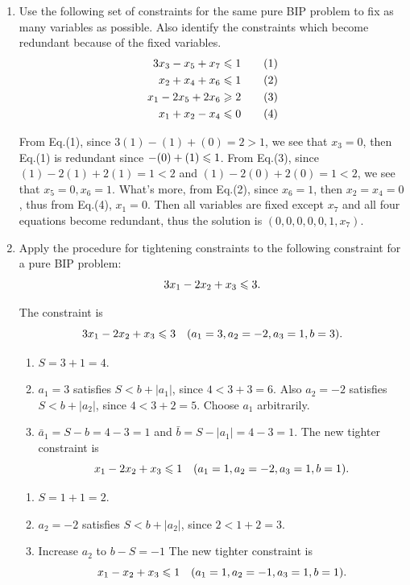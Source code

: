 \documentclass[a4paper]{article}
\begin{document}
\begin{enumerate}
\item Use the following set of constraints for the same pure BIP problem to fix as many variables as possible. Also identify the constraints which become redundant because of the fixed variables.
\begin{equation*}
\begin{aligned}
3x_3-x_5+x_7&\leqslant 1\qquad(1)\\
x_2+x_4+x_6&\leqslant 1\qquad(2)\\
x_1-2x_5+2x_6&\geqslant 2\qquad(3)\\
x_1+x_2-x_4&\leqslant 0\qquad(4)\\
\end{aligned}
\end{equation*}

\begin{solution}
	
	From Eq.(1), since $3(1)-(1)+(0)=2>1$, we see that $x_3=0$, then Eq.(1) is redundant since $-(0)+(1)\leqslant 1$. From Eq.(3), since $  (1)-2(1)+2(1)=1<2$ and $(1)-2(0)+2(0)=1<2$, we see that $x_5=0, x_6=1$. What's more, from Eq.(2), since $x_6=1$, then $x_2=x_4=0$, thus from Eq.(4), $x_1=0$. Then all variables are fixed except $x_7$ and all four equations become redundant, thus the solution is $(0,0,0,0,0,1,x_7)$.
	
\end{solution}
\vspace*{-0.5cm}

\item Apply the procedure for tightening constraints to the following constraint for a pure BIP problem: $$3x_1-2x_2+x_3\leqslant 3.$$

\begin{solution}
	
	The constraint is $$3x_1-2x_2+x_3\leqslant 3\quad (a_1=3,a_2=-2,a_3=1,b=3).$$
	
	\begin{enumerate}
		\item $S=3+1=4$.
		\item $a_1=3$ satisfies $S<b+|a_1|$, since $4<3+3=6$. Also $a_2=-2$ satisfies $S<b+|a_2|$, since $4<3+2=5$. Choose $a_1$ arbitrarily. 
		\item $\bar{a}_1=S-b=4-3=1$ and $\bar{b}=S-|a_1|=4-3=1$. The new tighter constraint is $$x_1-2x_2+x_3\leqslant 1\quad(a_1=1,a_2=-2,a_3=1,b=1).$$
	\end{enumerate}

	\begin{enumerate}
		\item $S=1+1=2$.
		\item $a_2=-2$ satisfies $S<b+|a_2|$, since $2<1+2=3$. 
		\item Increase $a_2$ to $b-S=-1$ The new tighter constraint is $$x_1-x_2+x_3\leqslant 1\quad(a_1=1,a_2=-1,a_3=1,b=1).$$
	\end{enumerate}
	

\end{solution}
\end{enumerate}
\end{document}
